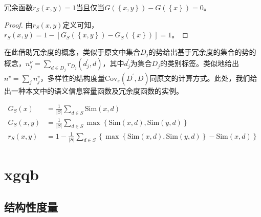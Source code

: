 \documentclass{../notes}
\newcommand{\Cov}{\text{Cov}}
\newcommand{\Sim}{\text{Sim}}
\begin{document}
    \begin{proposition}
        冗余函数$r_S\left(x,y\right)=1$当且仅当$G\left(\left\{x,y\right\}\right)-G\left(\left\{x\right\}\right)=0$。
    \end{proposition}

    \begin{proof}
        由$r_S\left(x,y\right)$定义可知，$r_S\left(x,y\right)=1-\left[G_S\left(\left\{x,y\right\}\right)-G_S\left(\left\{x\right\}\right)\right]=1$。
    \end{proof}

    在此借助冗余度的概念，类似于原文中集合$D_j$的势给出基于冗余度的集合的势的概念，$n_j^\nu=\sum_{d\in D_j}{r_{D_j}(d_j^\prime,d)}$，其中$d_j^\prime$为集合$D_j$的类别标签。类似地给出$n^v=\sum_{j} n_j^v$，多样性的结构度量$\Cov_s(D^\prime,D)$同原文的计算方式。此处，我们给出一种本文中的语义信息容量函数及冗余度函数的实例。

    \begin{align}
        G_S({x})&=\frac{1}{|S|}\sum_{d\in S}{\Sim(x,d)} \\
        G_S({x,y})&=\frac{1}{|S|}\sum_{d\in S}\max\left\{\Sim(x,d),\Sim(y,d)\right\} \\
        r_S\left(x,y\right)&=1-\frac{1}{\left|S\right|}\sum_{d\in S}\left\{\max\left\{\Sim\left(x,d\right),\Sim\left(y,d\right)\right\}-\Sim\left(x,d\right)\right\}
    \end{align}

    \section{xgqb}

    \subsection{结构性度量}
\end{document}
